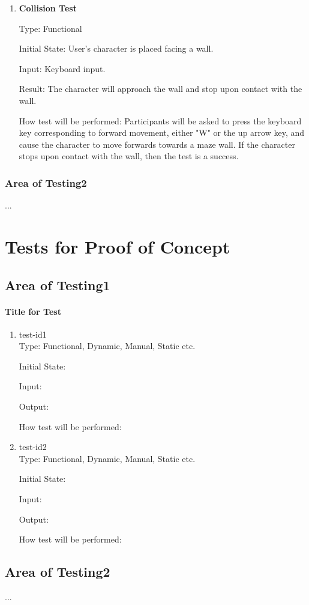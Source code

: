 \documentclass[12pt, titlepage]{article}
\begin{document}
\begin{enumerate}
\item{}
\textbf{Collision Test}

Type: Functional
					
Initial State: User's character is placed facing a wall.
					
Input: Keyboard input.
					
Result: The character will approach the wall and stop upon contact with the wall.  
					
How test will be performed: Participants will be asked to press the keyboard key corresponding to forward movement, either "W" or the up arrow key, and cause the character to move forwards towards a maze wall. If the character stops upon contact with the wall, then the test is a success. 
\end{enumerate}
\subsubsection{Area of Testing2}
...
\section{Tests for Proof of Concept}
\subsection{Area of Testing1}
		
\paragraph{Title for Test}
\begin{enumerate}
\item{test-id1\\}
Type: Functional, Dynamic, Manual, Static etc.
					
Initial State: 
					
Input: 
					
Output: 
					
How test will be performed: 
					
\item{test-id2\\}
Type: Functional, Dynamic, Manual, Static etc.
					
Initial State: 
					
Input: 
					
Output: 
					
How test will be performed: 
\end{enumerate}
\subsection{Area of Testing2}
...
	
\end{document}
